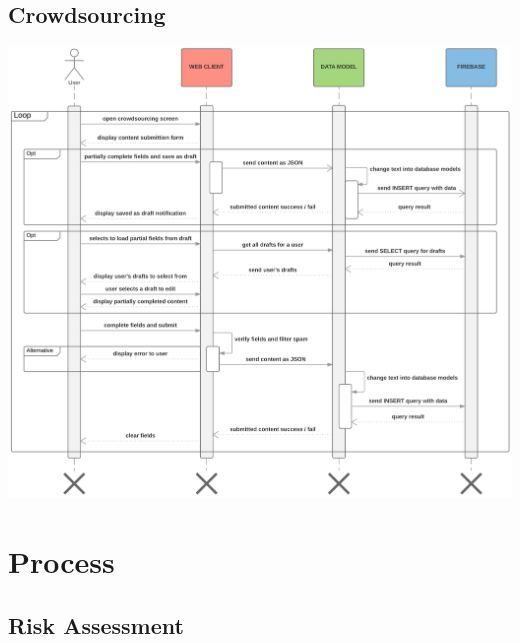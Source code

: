 \documentclass[11pt]{article}
\begin{document}
\newpage

\subsection{Crowdsourcing}

\begin{centering}
\includegraphics[width = 0.7\textheight]{ryan.png}

\end{centering}
\newpage
\section{Process}

\subsection{Risk Assessment}
\end{document}
